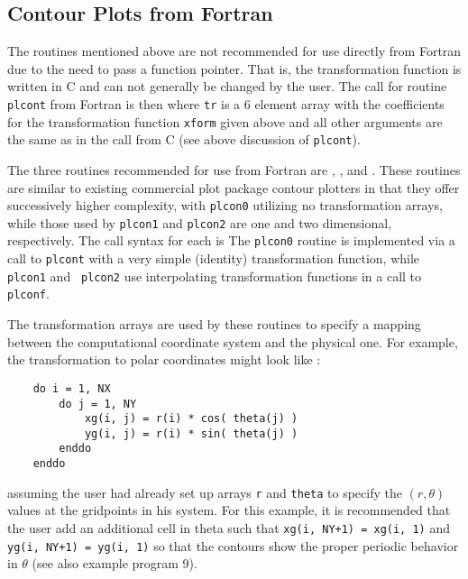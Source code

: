 \subsection {Contour Plots from Fortran}

The routines mentioned above are not recommended for use directly from
Fortran due to the need to pass a function pointer.  That is, the
transformation function is written in C and can not generally be changed by
the user.  The call for routine {\tt plcont} from Fortran is then
where {\tt tr} is a 6 element array with the coefficients for the
transformation function {\tt xform} given above and all other arguments are
the same as in the call from C (see above discussion of {\tt plcont}). 

The three routines recommended for use from Fortran are
, , and .  These routines are similar to
existing commercial plot package contour plotters in that they offer
successively higher complexity, with {\tt plcon0} utilizing no
transformation arrays, while those used by {\tt plcon1} and {\tt plcon2} 
are one and two dimensional, respectively.  The call syntax for each is
The {\tt plcon0} routine is implemented via a call to {\tt plcont} with a
very simple (identity) transformation function, while {\tt plcon1} and {\tt
plcon2} use interpolating transformation functions in a call to {\tt
plconf}.

The transformation arrays are used by these routines to specify a mapping
between the computational coordinate system and the physical one.  For
example, the transformation to polar coordinates might look like :
\begin{verbatim}
    do i = 1, NX
        do j = 1, NY
            xg(i, j) = r(i) * cos( theta(j) )
            yg(i, j) = r(i) * sin( theta(j) )
        enddo
    enddo
\end{verbatim}
assuming the user had already set up arrays {\tt r} and {\tt theta} to
specify the $(r, \theta)$ values at the gridpoints in his system.  For this
example, it is recommended that the user add an additional cell in theta
such that {\tt xg(i, NY+1) = xg(i, 1)} and {\tt yg(i, NY+1) = yg(i, 1)} so
that the contours show the proper periodic behavior in $\theta$ (see also
example program 9).


